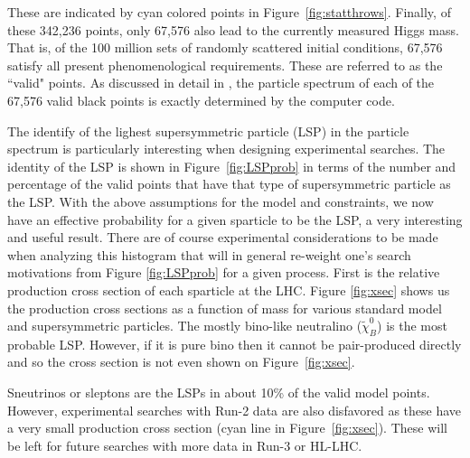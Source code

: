 These are indicated by cyan colored points in Figure~\ref{fig:statthrows}.
Finally, of these 342,236 points, only 67,576 also lead to the currently measured Higgs mass.
That is, of the 100 million sets of randomly scattered initial conditions, 67,576 satisfy all present phenomenological requirements.
These are referred to as the ``valid" points.
As discussed in detail in \cite{Ovrut:2015uea}, the particle spectrum of each of the 67,576 valid black points is exactly determined by the computer code.

The identify of the lighest supersymmetric particle (LSP) in the particle spectrum is particularly interesting when designing experimental searches.
The identity of the LSP is shown in Figure~\ref{fig:LSPprob} in terms of the number and percentage of the valid points that have that type of supersymmetric particle as the LSP.
With the above assumptions for the model and constraints, we now have an effective probability for a given sparticle to be the LSP, a very interesting and useful result.
There are of course experimental considerations to be made when analyzing this histogram that will in general re-weight one's search motivations from Figure \ref{fig:LSPprob} for a given process. 
First is the relative production cross section of each sparticle at the LHC.
Figure \ref{fig:xsec} shows us the production cross sections as a function of mass for various standard model and supersymmetric particles.
The mostly bino-like neutralino ($\tilde{\chi}^{0}_{B}$) is the most probable LSP.
However, if it is pure bino then it cannot be pair-produced directly and so the cross section is not even shown on Figure~\ref{fig:xsec}.

Sneutrinos or sleptons are the LSPs in  about 10\% of the valid model points.
However, experimental searches with Run-2 data are also disfavored as these have a very small production cross section (cyan line in Figure~\ref{fig:xsec}).
These will be left for future searches with more data in Run-3 or HL-LHC.

